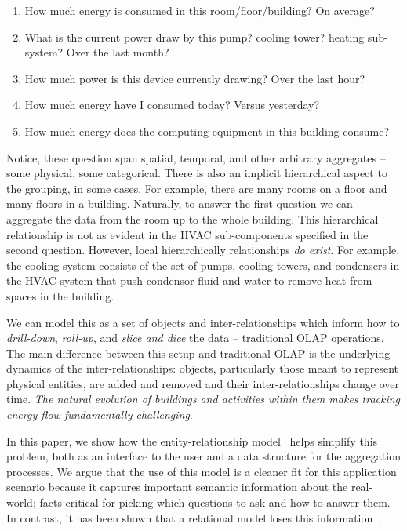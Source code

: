 \begin{enumerate}
\item How much energy is consumed in this room/floor/building?  On average?
\item What is the current power draw by this pump? cooling tower? heating sub-system?  Over
		the last month?
\item How much power is this device currently drawing? Over the last hour?
\item How much energy have I consumed today?  Versus yesterday?
\item How much energy does the computing equipment in this building consume?
\end{enumerate}
\vspace{0.08in}

Notice, these question span spatial, temporal, and other arbitrary aggregates -- some physical, some
categorical.  There is also
an implicit hierarchical aspect to the grouping, in some cases.  For example, there are many
rooms on a floor and many floors in a building.  Naturally, to answer the first question we can
aggregate the data from the room up to the whole building.  This hierarchical relationship
is not as evident in the HVAC sub-components specified in the second question.  However,
local hierarchically relationships \emph{do exist}.  For example, the cooling system consists
of the set of pumps, cooling towers, and condensers in the HVAC system that push condensor
fluid and water to remove heat from spaces in the building.

We can model this as a set of objects and inter-relationships which inform how
to \emph{drill-down}, \emph{roll-up}, and \emph{slice and dice} the data -- traditional OLAP operations.
The main difference between this setup and traditional OLAP is the underlying dynamics of the
inter-relationships: objects, particularly those meant to represent physical entities, are added and removed and 
their inter-relationships change over time.  \emph{The natural evolution of buildings and activities 
within them makes tracking energy-flow fundamentally challenging}.

In this paper, we show how the entity-relationship model~\cite{Chen76theentity-relationship} helps simplify 
this problem, both as an interface
to the user and a data structure for the aggregation processes.  We argue that the use of this model is a cleaner
fit for this application scenario because it captures important semantic information about the real-world;
facts critical for picking which questions to ask and how to answer them.  In contrast, it has been shown 
that a relational model loses this information~\cite{SenkoDB}.














